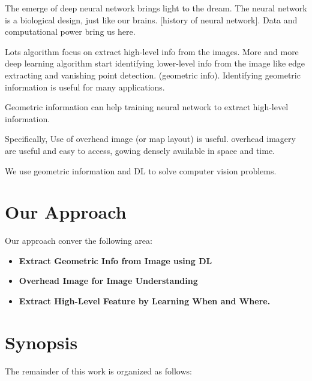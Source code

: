 The emerge of deep neural network brings light to the dream. The
neural network is a biological design, just like our brains. [history
of neural network]. Data and computational power bring us here.

Lots algorithm focus on extract high-level info from the images. More
and more deep learning algorithm start identifying lower-level info
from the image like edge extracting and vanishing point detection.
(geometric info). Identifying geometric information is useful for many
applications.

Geometric information can help training neural network to extract
high-level information.

Specifically, Use of overhead image (or map layout) is useful.
overhead imagery are useful and easy to access, gowing densely
available in space and time.

We use geometric information and DL to solve computer vision problems.


\section{Our Approach}
Our approach conver the following area:

\begin{itemize}[noitemsep]

  \item \textbf{Extract Geometric Info from Image using DL}

  \item \textbf{Overhead Image for Image Understanding}

  \item \textbf{Extract High-Level Feature by Learning When and Where.}

\end{itemize}


\section{Synopsis}

The remainder of this work is organized as follows:
  
